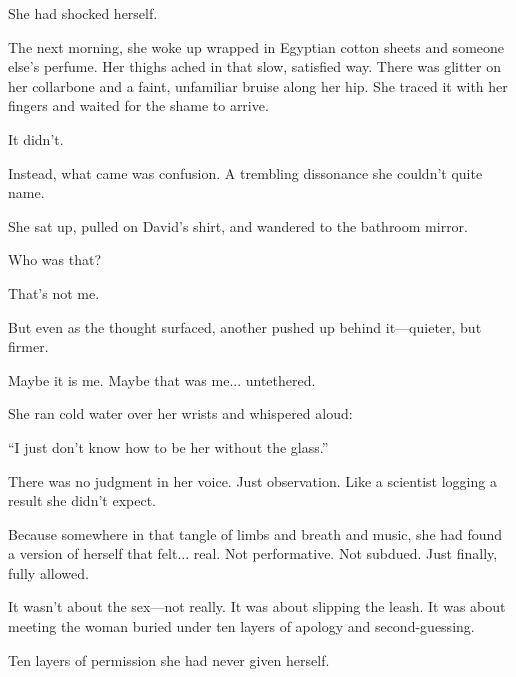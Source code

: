 She had shocked herself.

The next morning, she woke up wrapped in Egyptian cotton sheets and someone else’s perfume. Her thighs 
ached in that slow, satisfied way. There was glitter on her collarbone and a faint, unfamiliar bruise 
along her hip. She traced it with her fingers and waited for the shame to arrive.

It didn’t.

Instead, what came was confusion. A trembling dissonance she couldn’t quite name.

She sat up, pulled on David’s shirt, and wandered to the bathroom mirror.

Who was that?

That’s not me.

But even as the thought surfaced, another pushed up behind it—quieter, but firmer.

Maybe it is me. Maybe that was me... untethered.

She ran cold water over her wrists and whispered aloud:

“I just don’t know how to be her without the glass.”

There was no judgment in her voice. Just observation. Like a scientist logging a result she didn’t expect.

Because somewhere in that tangle of limbs and breath and music, she had found a version of herself that 
felt... real.
Not performative. Not subdued. Just finally, fully allowed.

It wasn’t about the sex—not really.
It was about slipping the leash.
It was about meeting the woman buried under ten layers of apology and second-guessing.

Ten layers of permission she had never given herself.

